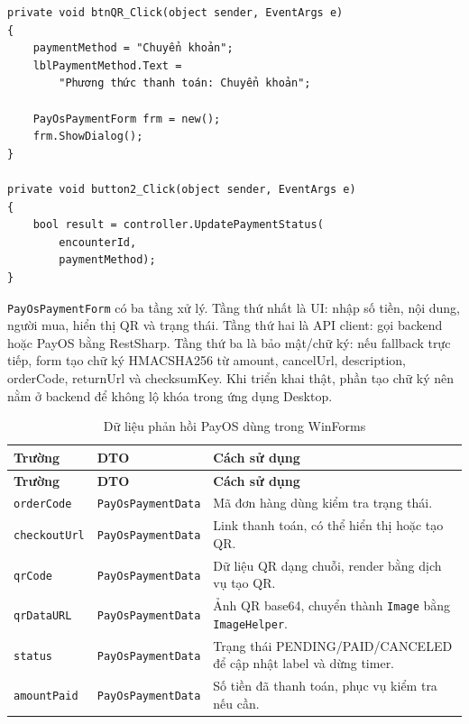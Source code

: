\documentclass[12pt,a4paper]{article}
\numberwithin{figure}{subsection}
\numberwithin{table}{subsection}
\newcounter{codecounter}
\newenvironment{codeblock}[2]{%
    \refstepcounter{codecounter}%
    \phantomsection%
    \label{#1}%
    \par\smallskip
}{%
    \par\smallskip
}
\begin{document}
\begin{codeblock}{code:payment-method-flow}{Chọn phương thức thanh toán trong PaymentDetail}
\begin{verbatim}
private void btnQR_Click(object sender, EventArgs e)
{
    paymentMethod = "Chuyển khoản";
    lblPaymentMethod.Text =
        "Phương thức thanh toán: Chuyển khoản";

    PayOsPaymentForm frm = new();
    frm.ShowDialog();
}

private void button2_Click(object sender, EventArgs e)
{
    bool result = controller.UpdatePaymentStatus(
        encounterId,
        paymentMethod);
}
\end{verbatim}
\end{codeblock}

\texttt{PayOsPaymentForm} có ba tầng xử lý. Tầng thứ nhất là UI: nhập số tiền, nội dung, người mua, hiển thị QR và trạng thái. Tầng thứ hai là API client: gọi backend hoặc PayOS bằng RestSharp. Tầng thứ ba là bảo mật/chữ ký: nếu fallback trực tiếp, form tạo chữ ký HMACSHA256 từ amount, cancelUrl, description, orderCode, returnUrl và checksumKey. Khi triển khai thật, phần tạo chữ ký nên nằm ở backend để không lộ khóa trong ứng dụng Desktop.

\begin{longtable}{|p{3.5cm}|p{4.8cm}|p{5.5cm}|}
\caption{Dữ liệu phản hồi PayOS dùng trong WinForms} \\
\hline
\textbf{Trường} & \textbf{DTO} & \textbf{Cách sử dụng} \\
\hline
\endfirsthead
\hline
\textbf{Trường} & \textbf{DTO} & \textbf{Cách sử dụng} \\
\hline
\endhead
\texttt{orderCode} & \texttt{PayOsPaymentData} & Mã đơn hàng dùng kiểm tra trạng thái. \\
\hline
\texttt{checkoutUrl} & \texttt{PayOsPaymentData} & Link thanh toán, có thể hiển thị hoặc tạo QR. \\
\hline
\texttt{qrCode} & \texttt{PayOsPaymentData} & Dữ liệu QR dạng chuỗi, render bằng dịch vụ tạo QR. \\
\hline
\texttt{qrDataURL} & \texttt{PayOsPaymentData} & Ảnh QR base64, chuyển thành \texttt{Image} bằng \texttt{ImageHelper}. \\
\hline
\texttt{status} & \texttt{PayOsPaymentData} & Trạng thái PENDING/PAID/CANCELED để cập nhật label và dừng timer. \\
\hline
\texttt{amountPaid} & \texttt{PayOsPaymentData} & Số tiền đã thanh toán, phục vụ kiểm tra nếu cần. \\
\hline
\end{longtable}
\end{document}

